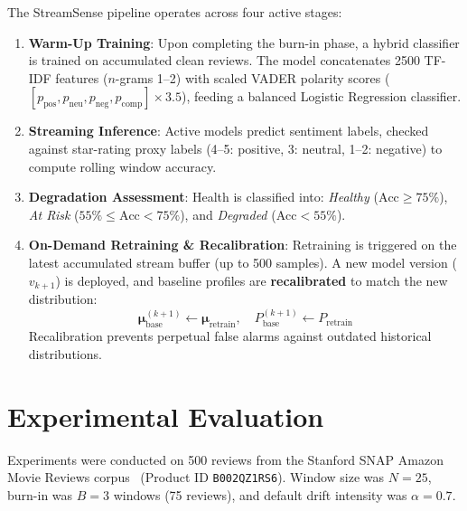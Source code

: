 \documentclass[conference]{IEEEtran}
\begin{document}
The StreamSense pipeline operates across four active stages:
\begin{enumerate}
    \item \textbf{Warm-Up Training}: Upon completing the burn-in phase, a hybrid classifier is trained on accumulated clean reviews. The model concatenates 2500 TF-IDF features ($n$-grams 1--2) with scaled VADER polarity scores ($[p_{\text{pos}}, p_{\text{neu}}, p_{\text{neg}}, p_{\text{comp}}] \times 3.5$), feeding a balanced Logistic Regression classifier.
    \item \textbf{Streaming Inference}: Active models predict sentiment labels, checked against star-rating proxy labels (4--5: positive, 3: neutral, 1--2: negative) to compute rolling window accuracy.
    \item \textbf{Degradation Assessment}: Health is classified into: \textit{Healthy} ($\text{Acc} \ge 75\%$), \textit{At Risk} ($55\% \le \text{Acc} < 75\%$), and \textit{Degraded} ($\text{Acc} < 55\%$).
    \item \textbf{On-Demand Retraining \& Recalibration}: Retraining is triggered on the latest accumulated stream buffer (up to 500 samples). A new model version ($v_{k+1}$) is deployed, and baseline profiles are \textbf{recalibrated} to match the new distribution:
    \begin{equation}
    \boldsymbol{\mu}_{\text{base}}^{(k+1)} \leftarrow \boldsymbol{\mu}_{\text{retrain}}, \quad P_{\text{base}}^{(k+1)} \leftarrow P_{\text{retrain}}
    \end{equation}
    Recalibration prevents perpetual false alarms against outdated historical distributions.
\end{enumerate}

\section{Experimental Evaluation}

Experiments were conducted on 500 reviews from the Stanford SNAP Amazon Movie Reviews corpus~\cite{mcauley2013amateurs} (Product ID \texttt{B002QZ1RS6}). Window size was $N=25$, burn-in was $B=3$ windows (75 reviews), and default drift intensity was $\alpha=0.7$.
\end{document}
